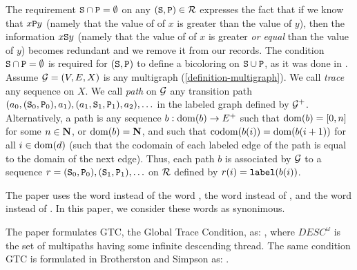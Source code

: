 \documentclass{lmcs}
\begin{document}
The requirement ${\tt S} \cap {\tt P} = \emptyset$ 
on any $({\tt S},{\tt P}) \in {\mathcal R}$ expresses the fact that
if we know that $x {\tt P} y$ (namely that
the value of of $x$ is greater than the value of $y$), then the information
$x {\tt S} y$ (namely that the value of of $x$ is greater \emph{or equal} 
than the value of $y$) becomes redundant and we remove it from our records.
The condition ${\tt S} \cap {\tt P} = \emptyset$ is required for
$({\tt S},{\tt P})$ to define a bicoloring on ${\tt S} \cup {\tt P}$, as it was done in
\cite{Lee1}.
\\

Assume ${\mathcal G} = (V,E,X)$ is any multigraph (\ref{definition-multigraph}). 
We call \emph{trace} any sequence on $X$. 
We call \emph{path} on ${\mathcal G}$ 
any transition path $(a_0,({\tt S}_0,{\tt P}_0),a_1), (a_1,{\tt S}_1,{\tt P}_1),a_2), \ldots$
in the labeled graph defined by ${\mathcal G}^+$.
Alternatively, a path is any sequence $b:{\rm dom}(b) \rightarrow E^+$ such that ${\rm dom}(b) = [0,n]$ 
for some $n \in {\bf N}$, or ${\rm dom} (b)={\bf N}$, and such that ${\rm codom}(b(i)) = {\rm dom}(b(i+1))$
for all $i \in {\rm dom}(d)$ (such that the codomain of each labeled edge of the path is equal
to the domain of the next edge).
Thus, each path $b$ is associated by ${\mathcal G}$ to a sequence 
$r = ({\tt S}_0,{\tt P}_0), ({\tt S}_1,{\tt P}_1), \ldots$ on ${\mathcal R}$ defined by $r(i) = {\tt label}(b(i))$. 

The paper \cite{Lee1}
uses the word  instead of the word  ,
the word  instead of ,
and the word   instead of .
In this paper, we consider these words as synonimous.

The paper \cite{Lee1} formulates GTC, the Global Trace Condition,
as: , 
where $DESC^\omega$ is the set of multipaths having some infinite descending thread.
The same condition GTC  is formulated in Brotherston and Simpson as: 
.


\end{document}
